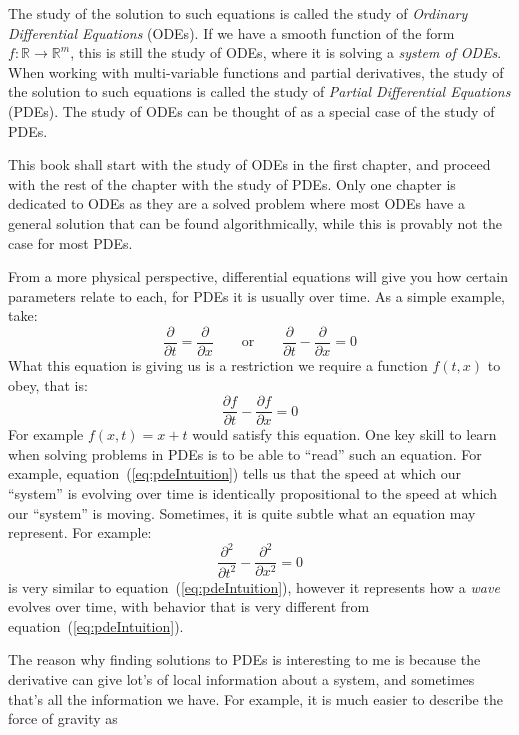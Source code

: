 \documentclass{book}
\newcommand{\R}{{\mathbb{R}}}
\begin{document}
The study of the solution to such equations is called the study of \emph{Ordinary Differential Equations}
(ODEs). If we have a smooth function of the form $f: \R \to \R^m$, this is still the study of ODEs,
where it is solving a \emph{system of ODEs}. When working with multi-variable functions and partial derivatives, the study of the solution to such
equations is called the study of \emph{Partial Differential Equations} (PDEs). The study of ODEs can be
thought of as a special case of the  study of PDEs.

This book shall start with the study of ODEs in the first chapter, and proceed with the rest of the chapter
with the study of PDEs. Only one chapter is dedicated to ODEs as they are a solved problem where most ODEs
have a general solution that can be found algorithmically, while this is provably not the case for most PDEs.



From a more physical perspective, differential equations will give you how certain parameters relate to each,
for PDEs it is usually over time. As a simple example, take:
\begin{equation}\label{eq:pdeIntuition}
  \frac{\partial }{\partial t} = \frac{\partial }{\partial x} \qquad \text{or} \qquad \frac{\partial }{\partial t}
  - \frac{\partial }{\partial x} = 0
\end{equation}
What this equation is giving us is a restriction we require a function $f(t,x)$ to obey, that is:
\[
	\frac{\partial f}{\partial t} - \frac{\partial f}{\partial x} = 0
\]
For example $f(x,t) = x+t$ would satisfy this equation. One key skill to learn when solving problems in PDEs is to be
able to ``read'' such an equation. For example, equation~(\ref{eq:pdeIntuition}) tells us that the speed at which our
``system'' is evolving over time is identically propositional to the speed at which our ``system'' is moving. Sometimes,
it is quite subtle what an equation may represent. For example:
\[
	\frac{\partial^2}{\partial t^2} - \frac{\partial^2}{\partial x^2} = 0
\]
is very similar to equation~(\ref{eq:pdeIntuition}), however it represents how a \emph{wave} evolves over
time, with behavior that is very different from equation~(\ref{eq:pdeIntuition}).


The reason why finding solutions to PDEs is interesting to me is
because the derivative can give lot's of local information about a system, and sometimes that's all the information we
have. For example, it is much easier to describe the force of gravity as
\end{document}
